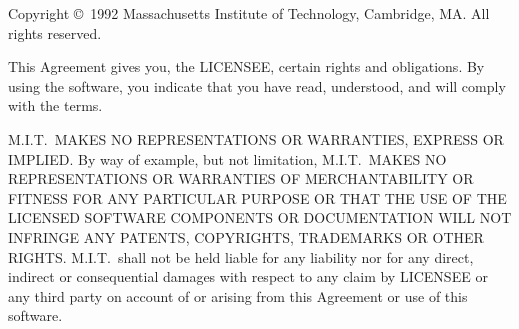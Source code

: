 \mbox{}
\vfill
\noindent Copyright \copyright\ 1992 Massachusetts Institute of Technology,
Cambridge, MA.  All rights reserved.

\vspace{\baselineskip}
\noindent This Agreement gives you, the LICENSEE, certain rights 
and obligations.
By using the software, you indicate that you have read, understood, and
will comply with the terms.

%
%

\vspace{\baselineskip}
\noindent M.I.T.\ MAKES NO REPRESENTATIONS OR WARRANTIES, 
EXPRESS OR IMPLIED.  By
way of example, but not limitation, M.I.T.\ MAKES NO REPRESENTATIONS OR
WARRANTIES OF MERCHANTABILITY OR FITNESS FOR ANY PARTICULAR PURPOSE OR
THAT THE USE OF THE LICENSED SOFTWARE COMPONENTS OR DOCUMENTATION WILL
NOT INFRINGE ANY PATENTS, COPYRIGHTS, TRADEMARKS OR OTHER RIGHTS.
M.I.T.\ shall not be held liable for any liability nor for any direct,
indirect or consequential damages with respect to any claim by LICENSEE
or any third party on account of or arising from this Agreement or use
of this software.

\cleardoublepage
